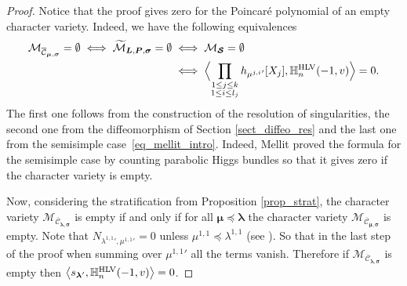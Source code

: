 \documentclass[JEP,XML,SOM,NoEqCountersInSection,Unicode,published]{cedram}
\newcommand{\HLV}{\textup{HLV}}
\theoremstyle{definition}
\theoremstyle{plain}
\newcommand{\mcmus}{\mathcal{M}_{\overline{\mathcal{C}}_{\boldsymbol{\mu},\boldsymbol{\sigma}}}}
\newcommand{\mlps}{\widetilde{\mathcal{M}}_{\boldsymbol{L},\boldsymbol{P},\boldsymbol{\sigma}}}
\begin{document}
\begin{proof}
Notice that the proof gives zero for the Poincaré polynomial of an empty character variety. Indeed, we have the following equivalences
\begin{align*}
\mcmus = \emptyset \iff \mlps = \emptyset &\iff \mathcal{M}_{\boldsymbol{\mathcal{S}}} = \emptyset \\
&\iff \Bigl\langle \prod_{\substack{1 \le j \le k \\ 1 \le i \le l_j}} h_{ {\mu^{j,i}}'}[X_j],\mathbb{H}_n^{\HLV}(-1,v)\Bigr\rangle = 0.
\end{align*}
The first one follows from the construction of the resolution of singularities, the second one from the diffeomorphism of Section \ref{sect_diffeo_res} and the last one from the semisimple case~\eqref{eq_mellit_intro}. Indeed, Mellit proved the formula for the semisimple case by counting parabolic Higgs bundles so that it gives zero if the character variety is empty.

Now, considering the stratification from Proposition \ref{prop_strat}, the character variety $\mathcal{M}_{\overline{\mathcal{C}}_{\boldsymbol{\lambda},\boldsymbol{\sigma}}}$ is empty if and only if for all $\boldsymbol{\mu} \preceq \boldsymbol{\lambda}$ the character variety $\mcmus$ is empty. Note that $N_{{\lambda^{1,1}}',{\mu^{1,1}}'} = 0$ unless $\mu^{1,1} \preceq \lambda^{1,1} $ (see \cite[I-6]{Macdonald}). So that in the last step of the proof when summing over ${\mu^{1,1}}'$ all the terms vanish. Therefore if $\mathcal{M}_{\overline{\mathcal{C}}_{\boldsymbol{\lambda},\boldsymbol{\sigma}}}$ is empty then $\left\langle s_{\boldsymbol{\lambda}'}, \mathbb{H}_n^{\HLV}(-1,v)\right\rangle = 0$.
\end{proof}
\end{document}
